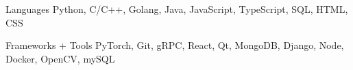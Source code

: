 \documentclass[12pt, letterpaper]{awesome-cv}
\begin{document}


\begin{cvskills}
  \cvskill
    {Languages} %
    {Python, C/C++, Golang, Java, JavaScript, TypeScript, SQL, HTML, CSS} %


  \cvskill
  {Frameworks + Tools} %
  {PyTorch, Git, gRPC, React, Qt, MongoDB, Django, Node, Docker, OpenCV, mySQL} %
  
    
\end{cvskills}

\end{document}
